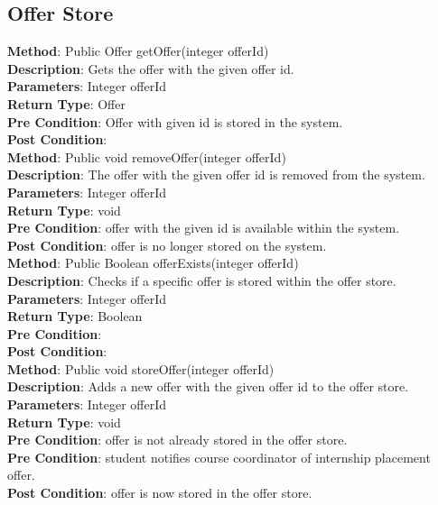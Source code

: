 \documentclass{l3deliverable}
\begin{document}
\subsection{Offer Store}

\textbf{Method}: Public Offer getOffer(integer offerId)\\ 
\textbf{Description}: Gets the offer with the given offer id. \\
\textbf{Parameters}: Integer offerId\\
\textbf{Return Type}: Offer\\
\textbf{Pre Condition}: Offer with given id is stored in the system.\\
\textbf{Post Condition}:\\

\textbf{Method}: Public void removeOffer(integer offerId)\\
\textbf{Description}: The offer with the given offer id is removed from the system. \\
\textbf{Parameters}: Integer offerId \\
\textbf{Return Type}: void\\
\textbf{Pre Condition}: offer with the given id is available within the system.\\
\textbf{Post Condition}: offer is no longer stored on the system.\\

\textbf{Method}: Public Boolean offerExists(integer offerId) \\
\textbf{Description}: Checks if a specific offer is stored within the offer store. \\
\textbf{Parameters}: Integer offerId\\
\textbf{Return Type}: Boolean\\
\textbf{Pre Condition}:\\
\textbf{Post Condition}:\\

\textbf{Method}: Public void storeOffer(integer offerId)\\
\textbf{Description}: Adds a new offer with the given offer id to the offer store. \\
\textbf{Parameters}: Integer offerId\\
\textbf{Return Type}: void\\
\textbf{Pre Condition}: offer is not already stored in the offer store.\\
\textbf{Pre Condition}: student notifies course coordinator of internship placement offer.\\
\textbf{Post Condition}: offer is now stored in the offer store.\\
\end{document}
